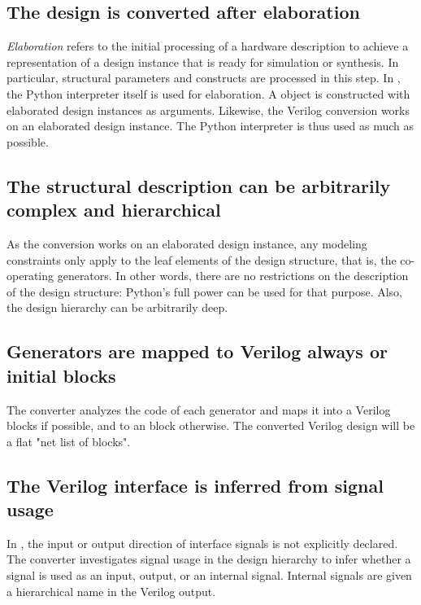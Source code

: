 \subsection{The design is converted after elaboration\label{conv-features-elab}}
\emph{Elaboration} refers to the initial processing of a hardware
description to achieve a representation of a design instance that is
ready for simulation or synthesis. In particular, structural
parameters and constructs are processed in this step. In \myhdl{}, the
Python interpreter itself is used for elaboration.  A
 object is constructed with elaborated design
instances as arguments.  Likewise, the Verilog conversion works on an
elaborated design instance. The Python interpreter is thus used as
much as possible.

\subsection{The structural description can be arbitrarily complex and hierarchical\label{conv-features-struc}}
As the conversion works on an elaborated design instance, any modeling
constraints only apply to the leaf elements of the design structure,
that is, the co-operating generators. In other words, there are no
restrictions on the description of the design structure: Python's full
power can be used for that purpose. Also, the design hierarchy can be
arbitrarily deep.

\subsection{Generators are mapped to Verilog always or initial blocks\label{conv-features-gen}}
The converter analyzes the code of each generator and maps it
into a Verilog  blocks if possible, and to 
an  block otherwise.
The converted Verilog design will be a flat
"net list of blocks".

\subsection{The Verilog interface is inferred from signal usage\label{conv-features-intf}}
In \myhdl{}, the input or output direction of interface signals
is not explicitly declared. The converter investigates signal usage
in the design hierarchy to infer whether a signal is used as an
input, output, or an internal signal. Internal signals are
given a hierarchical name in the Verilog output.

